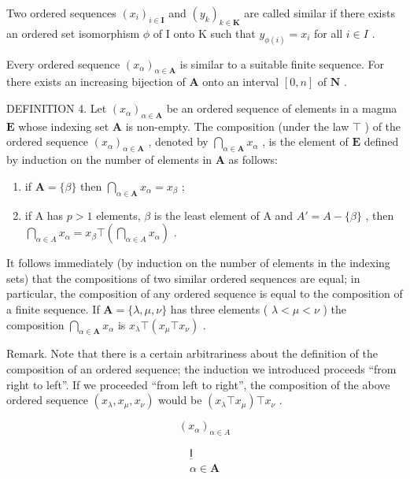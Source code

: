 Two ordered sequences \((x_{i})_{i\in\mathbf{I}}\) and \((y_{k})_{k\in\mathbf{K}}\) are called similar if there exists an ordered set isomorphism \(\phi\) of I onto K such that \(y_{\phi(i)} = x_{i}\) for all \(i \in I\) .

Every ordered sequence \((x_{\alpha})_{\alpha \in \mathbf{A}}\) is similar to a suitable finite sequence. For there exists an increasing bijection of \(\mathbf{A}\) onto an interval \([0, n]\) of \(\mathbf{N}\) .

DEFINITION 4. Let \((x_{\alpha})_{\alpha \in \mathbf{A}}\) be an ordered sequence of elements in a magma \(\mathbf{E}\) whose indexing set \(\mathbf{A}\) is non-empty. The composition (under the law \(\top\) ) of the ordered sequence \((x_{\alpha})_{\alpha \in \mathbf{A}}\) , denoted by \(\bigcap_{\alpha \in \mathbf{A}} x_{\alpha}\) , is the element of \(\mathbf{E}\) defined by induction on the number of elements in \(\mathbf{A}\) as follows:

\begin{enumerate}
\def\labelenumi{(\arabic{enumi})}
\item
  if \(\mathbf{A} = \{\beta\}\) then \(\bigcap_{\alpha \in \mathbf{A}} x_{\alpha} = x_{\beta}\) ;
\item
  if A has \(p > 1\) elements, \(\beta\) is the least element of A and \(A' = A - \{\beta\}\) , then \(\bigcap_{\alpha \in A} x_{\alpha} = x_{\beta} \top \left( \bigcap_{\alpha \in A} x_{\alpha} \right)\) .
\end{enumerate}

It follows immediately (by induction on the number of elements in the indexing sets) that the compositions of two similar ordered sequences are equal; in particular, the composition of any ordered sequence is equal to the composition of a finite sequence. If \(\mathbf{A} = \{\lambda, \mu, \nu\}\) has three elements ( \(\lambda < \mu < \nu\) ) the composition \(\bigcap_{\alpha \in \mathbf{A}} x_{\alpha}\) is \(x_{\lambda} \top (x_{\mu} \top x_{\nu})\) .

Remark. Note that there is a certain arbitrariness about the definition of the composition of an ordered sequence; the induction we introduced proceeds ``from right to left''. If we proceeded ``from left to right'', the composition of the above ordered sequence \((x_{\lambda}, x_{\mu}, x_{\nu})\) would be \((x_{\lambda} \top x_{\mu}) \top x_{\nu}\) .

\[
\left(x _ {\alpha}\right) _ {\alpha \in A}
\]

\[
\begin{array}{c} \underline {{\mathsf {I}}} \\ \alpha \in \mathbf {A} \end{array}
\]

